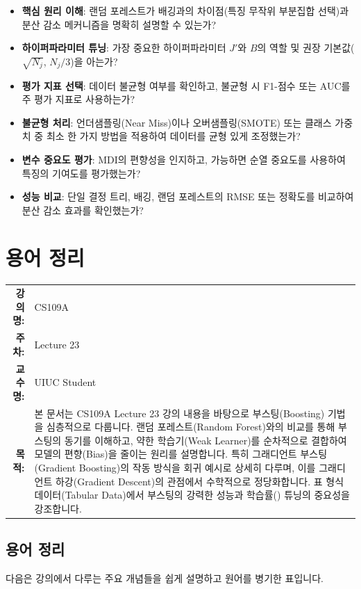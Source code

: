 \documentclass[11pt,a4paper]{book}
\makeatletter
\theoremstyle{definition}
\newcommand{\metainfo}[4]{
\begin{tcolorbox}[
    colback=lightpurple,
    colframe=darkpurple,
    boxrule=1pt,
    arc=2mm,
    left=10pt,
    right=10pt,
    top=8pt,
    bottom=8pt
]
\begin{tabular}{@{}rl@{}}
\textbf{강의명:} & #1 \\[0.3em]
\textbf{주차:} & #2 \\[0.3em]
\textbf{교수명:} & #3 \\[0.3em]
\textbf{목적:} & \begin{minipage}[t]{0.75\textwidth}#4\end{minipage}
\end{tabular}
\end{tcolorbox}
}
\makeatother
\begin{document}
\begin{tcolorbox}[infobox, title={랜덤 포레스트 구현 전 점검 사항}]
\begin{itemize}
    \item \textbf{핵심 원리 이해}: 랜덤 포레스트가 배깅과의 차이점(특징 무작위 부분집합 선택)과 분산 감소 메커니즘을 명확히 설명할 수 있는가?
    \item \textbf{하이퍼파라미터 튜닝}: 가장 중요한 하이퍼파라미터 $J'$와 $B$의 역할 및 권장 기본값($\sqrt{N_j}$, $N_j/3$)을 아는가?
    \item \textbf{평가 지표 선택}: 데이터 불균형 여부를 확인하고, 불균형 시 F1-점수 또는 AUC를 주 평가 지표로 사용하는가?
    \item \textbf{불균형 처리}: 언더샘플링(Near Miss)이나 오버샘플링(SMOTE) 또는 클래스 가중치 중 최소 한 가지 방법을 적용하여 데이터를 균형 있게 조정했는가?
    \item \textbf{변수 중요도 평가}: MDI의 편향성을 인지하고, 가능하면 순열 중요도를 사용하여 특징의 기여도를 평가했는가?
    \item \textbf{성능 비교}: 단일 결정 트리, 배깅, 랜덤 포레스트의 RMSE 또는 정확도를 비교하여 분산 감소 효과를 확인했는가?
\end{itemize}
\end{tcolorbox}


\chapter{용어 정리}
\label{ch:lecture23}

\metainfo{CS109A}{Lecture 23}{UIUC Student}{본 문서는 CS109A Lecture 23 강의 내용을 바탕으로 부스팅(Boosting) 기법을 심층적으로 다룹니다. 랜덤 포레스트(Random Forest)와의 비교를 통해 부스팅의 동기를 이해하고, 약한 학습기(Weak Learner)를 순차적으로 결합하여 모델의 편향(Bias)을 줄이는 원리를 설명합니다. 특히 그래디언트 부스팅(Gradient Boosting)의 작동 방식을 회귀 예시로 상세히 다루며, 이를 그래디언트 하강(Gradient Descent)의 관점에서 수학적으로 정당화합니다. 표 형식 데이터(Tabular Data)에서 부스팅의 강력한 성능과 학습률(\texttt{\lambda}) 튜닝의 중요성을 강조합니다.}


\section{용어 정리} %
다음은 강의에서 다루는 주요 개념들을 쉽게 설명하고 원어를 병기한 표입니다.
\end{document}
